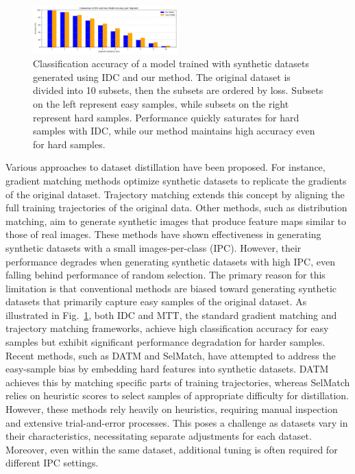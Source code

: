 \documentclass{article}
\theoremstyle{plain}
\theoremstyle{definition}
\theoremstyle{remark}
\begin{document}
\begin{figure}[t]
    \centering
    \includegraphics[width=0.5\textwidth]{./images/loss.png}
    \caption{Classification accuracy of a model trained with synthetic datasets generated using IDC and our method.
    The original dataset is divided into 10 subsets, then the subsets are ordered by loss. Subsets on the left represent easy samples,
    while subsets on the right represent hard samples. Performance quickly saturates
    for hard samples with IDC, while our method maintains high accuracy even for hard samples.}
    \label{fig:loss}
\end{figure}

Various approaches to dataset distillation have been proposed.
For instance, gradient matching methods optimize synthetic datasets to replicate the gradients
of the original dataset. Trajectory matching extends this concept by aligning the full
training trajectories of the original data. Other methods, such as distribution matching,
aim to generate synthetic images that produce feature maps similar to those of real images.
These methods have shown effectiveness in generating synthetic datasets with a small images-per-class (IPC).
However, their performance degrades when generating synthetic datasets with high IPC, even falling behind performance of random selection.
The primary reason for this limitation is that conventional methods are biased toward
generating synthetic datasets that primarily capture easy samples of the original dataset.
As illustrated in Fig.~\ref{fig:loss}, both IDC and MTT, the standard gradient matching and
trajectory matching frameworks, achieve high classification accuracy for easy samples but
exhibit significant performance degradation for harder samples.
Recent methods, such as DATM and SelMatch, have attempted to address the easy-sample bias by
embedding hard features into synthetic datasets. DATM achieves this by matching specific parts
of training trajectories, whereas SelMatch relies on heuristic scores to select
samples of appropriate difficulty for distillation.
However, these methods rely heavily on heuristics, requiring manual inspection and extensive
trial-and-error processes. This poses a challenge as datasets vary in their
characteristics, necessitating separate adjustments for each dataset. Moreover, even within
the same dataset, additional tuning is often required for different IPC settings.
\end{document}
